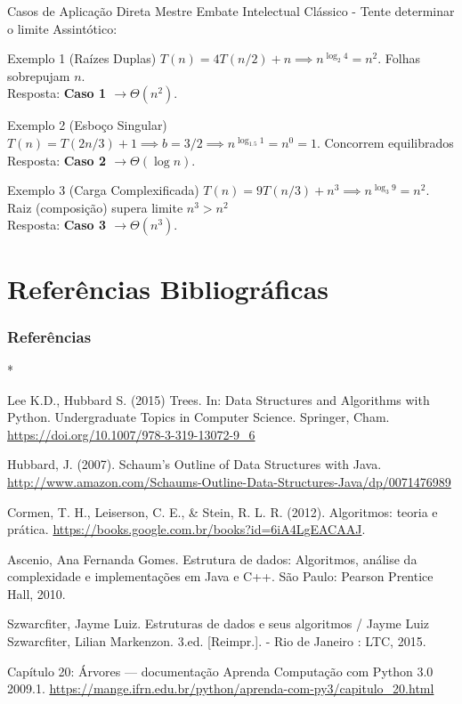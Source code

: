 \documentclass{beamer}
\begin{document}
\begin{frame}{Casos de Aplicação Direta Mestre}   
Embate Intelectual Clássico - Tente determinar o limite Assintótico:
\pause
\begin{block}{Exemplo 1 (Raízes Duplas)}
$T(n) = 4T(n/2) + n \implies n^{\log_2 4} = n^2$. Folhas sobrepujam $n$. \\
Resposta: \textbf{Caso 1 $\rightarrow \Theta(n^2)$}.
\end{block}
\pause
\begin{block}{Exemplo 2 (Esboço Singular)}
$T(n) = T(2n/3) + 1 \implies b=3/2 \implies n^{\log_{1.5} 1} = n^0 = 1$. Concorrem equilibrados \\
Resposta: \textbf{Caso 2 $\rightarrow \Theta(\log n)$}.
\end{block}
\pause
\begin{block}{Exemplo 3 (Carga Complexificada)}
$T(n) = 9T(n/3) + n^3 \implies n^{\log_3 9} = n^2$. Raiz (composição) supera limite $n^3 > n^2$ \\
Resposta: \textbf{Caso 3 $\rightarrow \Theta(n^3)$}.
\end{block}
\end{frame}


\section{Referências Bibliográficas}
\begin{frame}[t,allowframebreaks]
\frametitle{Referências}
\begin{thebibliography}{*}

         Lee K.D., Hubbard S. (2015) Trees. In: Data Structures and Algorithms with Python. Undergraduate Topics in Computer Science. Springer, Cham. \url{https://doi.org/10.1007/978-3-319-13072-9_6}
        
         Hubbard, J. (2007). Schaum’s Outline of Data Structures with Java. \url{http://www.amazon.com/Schaums-Outline-Data-Structures-Java/dp/0071476989}
        
         Cormen, T. H., Leiserson, C. E., \& Stein, R. L. R. (2012). Algoritmos: teoria e prática. \url{https://books.google.com.br/books?id=6iA4LgEACAAJ}.
        
         Ascenio, Ana Fernanda Gomes. Estrutura de dados: Algoritmos, análise da complexidade e implementações em Java e C++. São Paulo: Pearson Prentice Hall, 2010.
        
         Szwarcfiter, Jayme Luiz. Estruturas de dados e seus algoritmos / Jayme Luiz Szwarcfiter, Lilian Markenzon. 3.ed. [Reimpr.]. - Rio de Janeiro : LTC, 2015.
        
         Capítulo 20: Árvores — documentação Aprenda Computação com Python 3.0 2009.1. \url{https://mange.ifrn.edu.br/python/aprenda-com-py3/capitulo_20.html}
\end{thebibliography}
\end{frame}

\section{}
\begin{frame}
\titlepage
\end{frame}
\end{document}
